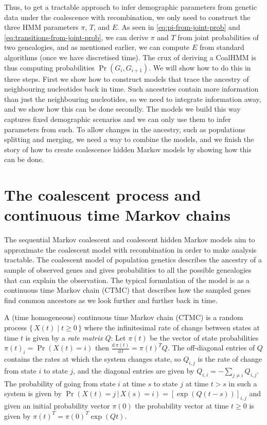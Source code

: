 \documentclass[graybox]{svmult}
\newcommand{\T}{\ensuremath{T}}
\renewcommand{\E}{\ensuremath{E}}
\begin{document}
Thus, to get a tractable approach to infer demographic parameters from genetic data under the coalescence with recombination, we only need to construct the three HMM parameters $\pi$, $\T$, and $\E$. As seen in \eqref{eq:pi-from-joint-prob} and \eqref{eq:transitions-from-joint-prob}, we can derive $\pi$ and $\T$ from joint probabilities of two genealogies, and as mentioned earlier, we can compute $\E$ from standard algorithms (once we have discretised time). The crux of deriving a CoalHMM is thus computing probabilities $\Pr(G_i,G_{i+1})$. We will show how to do this in three steps. First we show how to construct models that trace the ancestry of neighbouring nucleotides back in time. Such ancestries contain more information than just the neighbouring nucleotides, so we need to integrate information away, and we show how this can be done secondly. The models we build this way captures fixed demographic scenarios and we can only use them to infer parameters from such. To allow changes in the ancestry, such as populations splitting and merging, we need a way to combine the models, and we finish the story of how to create coalescence hidden Markov models by showing how this can be done.

\section{The coalescent process and continuous time Markov chains}

The sequential Markov coalescent and coalescent hidden Markov models aim to approximate the coalescent model with recombination in order to make analysis tractable. The coalescent model of population genetics describes the ancestry of a sample of observed genes and gives probabilities to all the possible genealogies that can explain the observation. The typical formulation of the model is as a continuous time Markov chain (CTMC) that describes how the sampled genes find common ancestors as we look further and further back in time. 

A (time homogeneous) continuous time Markov chain (CTMC) is a random process $\{\,X(t) \;|\; t \geq 0 \,\}$ where the infinitesimal rate of change between states at time $t$ is given by a \emph{rate matrix} $Q$: Let $\pi(t)$ be the vector of state probabilities $\pi(t)_i = \Pr(X(t)=i)$ then $\frac{\mathrm{d}\,\pi(t)}{\mathrm{d}\,t} = \pi(t)^TQ$. The off-diagonal entries of $Q$ contains the rates at which the system changes state, so $Q_{i,j}$ is the rate of change from state $i$ to state $j$, and the diagonal entries are given by $Q_{i,i} = - \sum_{j\neq i} Q_{i,j}$. The probability of going from state $i$ at time $s$ to state $j$ at time $t>s$ in such a system is given by $\Pr(X(t)=j\,|\,X(s)=i) = \left[\exp\left(Q\left(t-s\right)\right)\right]_{i,j}$ and given an initial probability vector $\pi(0)$ the probability vector at time $t\geq 0$ is given by $\pi(t)^T=\pi(0)^T\exp(Qt)$.
\end{document}
